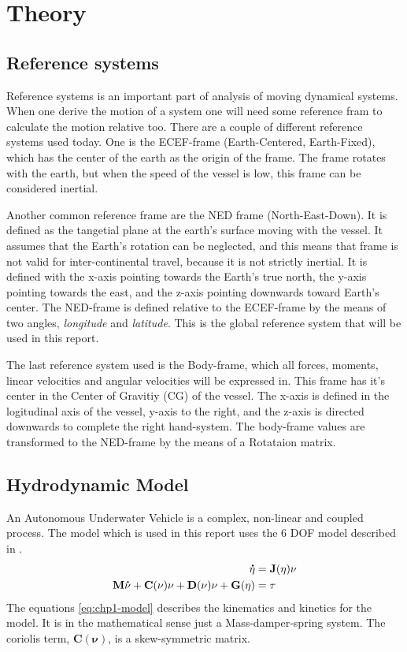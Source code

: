 \chapter{Theory}
	
\section{Reference systems}
	Reference systems is an important part of analysis of moving dynamical systems. When one derive the motion of 
	a system one will need some reference fram to calculate the motion relative too. There are a couple of different 
	reference systems used today. One is the ECEF-frame (Earth-Centered, Earth-Fixed), which has the center of the 
	earth as the origin of the frame. The frame rotates with the earth, but when the speed of the vessel is low, 
	this frame can be considered inertial. \cite{forsell}
	
	Another common reference frame are the NED frame (North-East-Down). It is defined as the tangetial plane at 
	the earth's surface moving with the vessel. It assumes that the Earth's rotation can be neglected, and this means 
	that frame is not valid for inter-continental travel, because it is not strictly inertial. It is defined with 
	the x-axis pointing towards the Earth's true north, the y-axis pointing towards the east, and the z-axis 
	pointing downwards toward Earth's center. The NED-frame is defined relative to the ECEF-frame by the means of 
	two angles, \textit{longitude} and \textit{latitude}. This is the global reference system that will be used 
	in this report. \cite{fossen}
	
	The last reference system used is the Body-frame, which all forces, moments, linear velocities and angular 
	velocities will be expressed in. This frame has it's center in the Center of Gravitiy (CG) of the vessel. The 
	x-axis is defined in the logitudinal axis of the vessel, y-axis to the right, and the z-axis is directed 
	downwards to complete the right hand-system. The body-frame values are transformed to the NED-frame by the means 
	of a Rotataion matrix.
	
	
	

\section{Hydrodynamic Model}
	An Autonomous Underwater Vehicle is a complex, non-linear and coupled process. The model which is used in this
	report uses the 6 DOF model described in \cite{fossen}.
		\begin{align}
			\label{eq:chp1-model}
			\mathbf{\dot{\eta}} &= \mathbf{J}(\mathbf{\eta}) \mathbf{\nu} \\
			\mathbf{M}\mathbf{\dot{\nu}} + \mathbf{C}(\mathbf{\nu})\mathbf{\nu} + \mathbf{D}(\mathbf{\nu})\mathbf{\nu} + \mathbf{G}(\mathbf{\eta}) &= \mathbf{\tau} \\
		\end{align}
	The equations \eqref{eq:chp1-model} describes the kinematics and kinetics for the model. It is in the 
	mathematical sense just a Mass-damper-spring system. The coriolis term, $\mathbf{C}(\mathbf{\nu})$, is 
	a skew-symmetric matrix.
	

